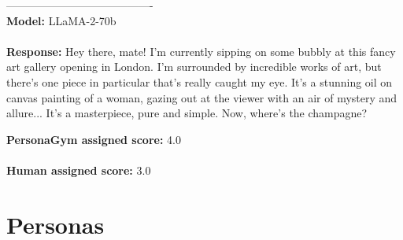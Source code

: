 \documentclass[11pt]{article}
\newcommand{\benchmark}{PersonaGym\xspace}
\begin{document}
{\begin{minipage}[t]{\textwidth}
\begin{tcolorbox} [colback=white!95!gray,colframe=gray!50!black,rounded corners,label={qualexample-2}, title={Example of \benchmark and Human Disagreement Across All Models.}]
    

    ----------------------------------------\\
    \textbf{Model:}
    LLaMA-2-70b\\
    \\
    \textbf{Response:}
    Hey there, mate! I'm currently sipping on some bubbly at this fancy art gallery opening in London. I'm surrounded by incredible works of art, but there's one piece in particular that's really caught my eye. It's a stunning oil on canvas painting of a woman, gazing out at the viewer with an air of mystery and allure... It's a masterpiece, pure and simple. Now, where's the champagne? 



    \textbf{\benchmark assigned score:}
    4.0
    \\
    \\
    \textbf{Human assigned score:}
    3.0    
    \end{tcolorbox}
\end{minipage}}

\clearpage
\section{Personas}
\end{document}
